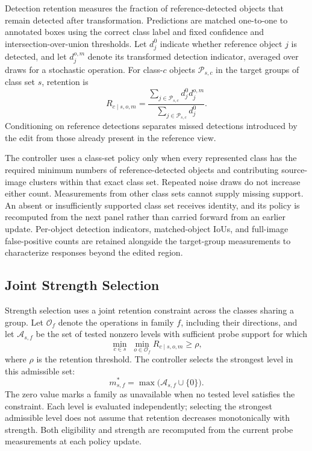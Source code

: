 \documentclass[conference]{IEEEtran}
\begin{document}
Detection retention measures the fraction of reference-detected objects that remain detected after transformation. Predictions are matched one-to-one to annotated boxes using the correct class label and fixed confidence and intersection-over-union thresholds. Let $d_j^0$ indicate whether reference object $j$ is detected, and let $d_j^{o,m}$ denote its transformed detection indicator, averaged over draws for a stochastic operation. For class-$c$ objects $\mathcal{P}_{s,c}$ in the target groups of class set $s$, retention is
\begin{equation}
 R_{c\mid s,o,m}=
 \frac{\sum_{j\in\mathcal{P}_{s,c}}d_j^0d_j^{o,m}}
      {\sum_{j\in\mathcal{P}_{s,c}}d_j^0}.
 \label{eq:retention}
\end{equation}
Conditioning on reference detections separates missed detections introduced by the edit from those already present in the reference view.

The controller uses a class-set policy only when every represented class has the required minimum numbers of reference-detected objects and contributing source-image clusters within that exact class set. Repeated noise draws do not increase either count. Measurements from other class sets cannot supply missing support. An absent or insufficiently supported class set receives identity, and its policy is recomputed from the next panel rather than carried forward from an earlier update. Per-object detection indicators, matched-object IoUs, and full-image false-positive counts are retained alongside the target-group measurements to characterize responses beyond the edited region.

\subsection{Joint Strength Selection}
\label{sec:method_strength}
Strength selection uses a joint retention constraint across the classes sharing a group. Let $\mathcal{O}_f$ denote the operations in family $f$, including their directions, and let $\mathcal{A}_{s,f}$ be the set of tested nonzero levels with sufficient probe support for which
\begin{equation}
 \min_{c\in s}\;\min_{o\in\mathcal{O}_f}
 R_{c\mid s,o,m}\geq\rho,
 \label{eq:joint_gate}
\end{equation}
where $\rho$ is the retention threshold. The controller selects the strongest level in this admissible set:
\begin{equation}
 m^*_{s,f}=\max\bigl(\mathcal{A}_{s,f}\cup\{0\}\bigr).
 \label{eq:selected_strength}
\end{equation}
The zero value marks a family as unavailable when no tested level satisfies the constraint. Each level is evaluated independently; selecting the strongest admissible level does not assume that retention decreases monotonically with strength. Both eligibility and strength are recomputed from the current probe measurements at each policy update.
\end{document}
